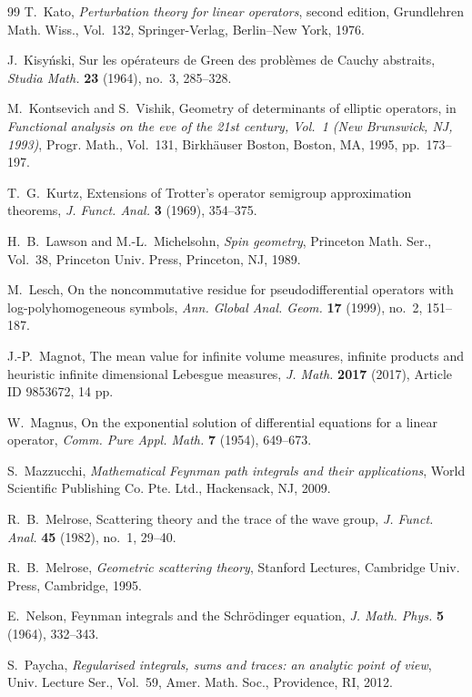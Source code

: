 \documentclass[11pt]{amsart}
\theoremstyle{plain}
\theoremstyle{definition}
\theoremstyle{remark}
\begin{document}
\begin{thebibliography}{99}
T.~Kato,
\emph{Perturbation theory for linear operators},
second edition,
Grundlehren Math. Wiss., Vol.~132,
Springer-Verlag, Berlin--New York, 1976.

J.~Kisy\'nski,
Sur les op\'erateurs de Green des probl\`emes de Cauchy abstraits,
\emph{Studia Math.} \textbf{23} (1964), no.~3, 285--328.

M.~Kontsevich and S.~Vishik,
Geometry of determinants of elliptic operators,
in \emph{Functional analysis on the eve of the 21st century, Vol.~1
(New Brunswick, NJ, 1993)},
Progr. Math., Vol.~131,
Birkh\"auser Boston, Boston, MA, 1995, pp.~173--197.

T.~G.~Kurtz,
Extensions of Trotter's operator semigroup approximation theorems,
\emph{J. Funct. Anal.} \textbf{3} (1969), 354--375.

H.~B.~Lawson and M.-L.~Michelsohn,
\emph{Spin geometry},
Princeton Math. Ser., Vol.~38,
Princeton Univ. Press, Princeton, NJ, 1989.

M.~Lesch,
On the noncommutative residue for pseudodifferential operators with
log-polyhomogeneous symbols,
\emph{Ann. Global Anal. Geom.} \textbf{17} (1999), no.~2, 151--187.

J.-P.~Magnot,
The mean value for infinite volume measures, infinite products and
heuristic infinite dimensional Lebesgue measures,
\emph{J. Math.} \textbf{2017} (2017), Article ID 9853672, 14 pp.

W.~Magnus,
On the exponential solution of differential equations for a linear operator,
\emph{Comm. Pure Appl. Math.} \textbf{7} (1954), 649--673.

S.~Mazzucchi,
\emph{Mathematical Feynman path integrals and their applications},
World Scientific Publishing Co. Pte. Ltd., Hackensack, NJ, 2009.

R.~B.~Melrose,
Scattering theory and the trace of the wave group,
\emph{J. Funct. Anal.} \textbf{45} (1982), no.~1, 29--40.

R.~B.~Melrose,
\emph{Geometric scattering theory},
Stanford Lectures,
Cambridge Univ. Press, Cambridge, 1995.

E.~Nelson,
Feynman integrals and the Schr\"odinger equation,
\emph{J. Math. Phys.} \textbf{5} (1964), 332--343.

S.~Paycha,
\emph{Regularised integrals, sums and traces: an analytic point of view},
Univ. Lecture Ser., Vol.~59,
Amer. Math. Soc., Providence, RI, 2012.


\end{thebibliography}
\end{document}
